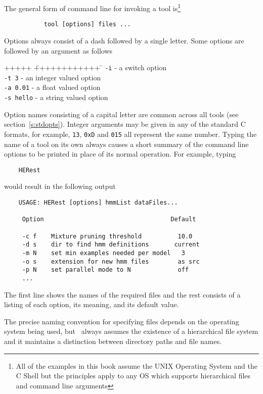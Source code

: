 The general form of command line for invoking a tool 
is\footnote{All of the examples in this book assume the
UNIX Operating System and the C Shell but the principles apply to
any OS which supports hierarchical files and command line arguments}
\begin{verbatim}
           tool [options] files ...
\end{verbatim}
Options always consist of a dash followed by a single letter.  Some options
are followed by an argument as follows
\begin{tabbing}
+++++ \= ++++++++++++ \=  \kill
\>           \texttt{-i} \>  - a switch option \\
\>           \texttt{-t 3} \> - an integer valued option \\
\>           \texttt{-a 0.01} \> - a float valued option \\
\>           \texttt{-s hello} \> - a string valued option 
\end{tabbing}   
Option names consisting of a capital letter are common across all tools
(see section~\ref{s:stdopts}).
Integer arguments may be given 
in any of the standard C formats, for example,
\texttt{13}, \texttt{0xD} and \texttt{015} all represent the same number.
Typing the name of a tool on its own always causes a short summary of
the command line options to be printed in place of its normal
operation.  For example, typing
\begin{verbatim}
    HERest
\end{verbatim}
would result in the following output
\begin{verbatim}
    USAGE: HERest [options] hmmList dataFiles...

     Option                                   Default

     -c f    Mixture pruning threshold          10.0
     -d s    dir to find hmm definitions       current
     -m N    set min examples needed per model   3
     -o s    extension for new hmm files        as src
     -p N    set parallel mode to N             off
     ...
\end{verbatim}
The first line shows the names of the required files and the rest
consists of a listing of each option, its meaning, and its default
value.

The precise naming convention for specifying files depends on the operating
system being used, but \HTK\ always assumes the existence of a hierarchical
file system and it maintains a distinction between directory paths
and file names.

